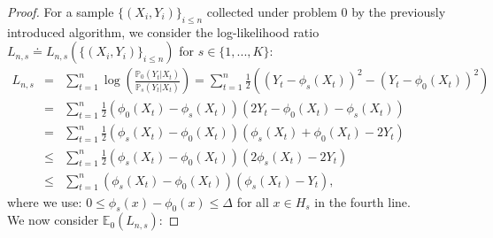 \documentclass[final,12pt]{colt2018}
\begin{document}
\begin{proof}
For a sample $\{(X_i,Y_i)\}_{i\leq n}$ collected under problem $0$ by the previously introduced algorithm, we consider the log-likelihood ratio $L_{n,s} \doteq L_{n,s}(\{(X_i,Y_i)\}_{i\leq n})$ for $s \in \{1, ..., K\}$:
\begin{eqnarray}\label{eq:bound_L}
L_{n,s} & = & \sum_{t=1}^n \log\left(\frac{\mathbb P_0(Y_t | X_t)}{\mathbb P_s(Y_t | X_t)}\right) = \sum_{t=1}^n \frac{1}{2}\left( (Y_t-\phi_s(X_t))^2 - (Y_t-\phi_0(X_t))^2 \right) \nonumber\\
& = & \sum_{t=1}^n \frac{1}{2}(\phi_0(X_t)-\phi_s(X_t))(2 Y_t-\phi_0(X_t) - \phi_s(X_t)) \nonumber\\
& = & \sum_{t=1}^n \frac{1}{2} (\phi_s(X_t)-\phi_0(X_t))(\phi_s(X_t)+\phi_0(X_t)-2 Y_t) \nonumber\\
& \leq & \sum_{t=1}^n \frac{1}{2} (\phi_s(X_t)-\phi_0(X_t))(2\phi_s(X_t)-2 Y_t) \nonumber\\
& \leq & \sum_{t=1}^n  (\phi_s(X_t)-\phi_0(X_t))(\phi_s(X_t)-Y_t),
\end{eqnarray}
where we use: $0 \leq \phi_s(x) - \phi_0(x) \leq \Delta$ for all $x\in H_s$ in the fourth line.\\
We now consider $\mathbb E_0(L_{n,s})$:


\end{proof}
\end{document}
